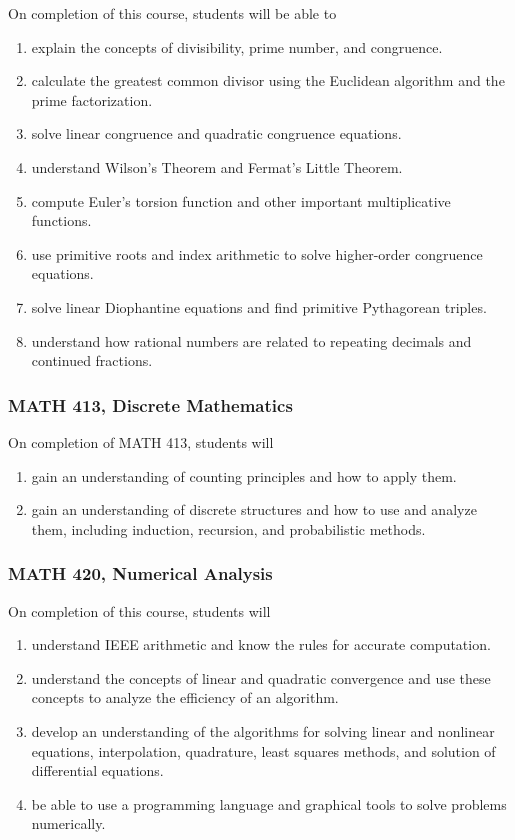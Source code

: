 \documentclass[11pt]{article}
\newenvironment{alphalist}{
\begin{enumerate}[label=(\arabic*),widest=107 ,leftmargin=25pt, itemsep=0pt]}
{\end{enumerate}}
\begin{document}
On completion of this course, students will be able to
\begin{alphalist}
    \item explain the concepts of divisibility, prime number, and congruence. 
    \item calculate the greatest common divisor using the Euclidean algorithm and the prime factorization.
    \item solve linear congruence and quadratic congruence equations.
    \item understand Wilson's Theorem and Fermat's Little Theorem. 
    \item compute Euler's torsion function and other important multiplicative functions.
    \item use primitive roots and index arithmetic to solve higher-order congruence equations.  
    \item solve linear Diophantine equations and find primitive Pythagorean triples.
    \item understand how rational numbers are related to repeating decimals and continued fractions.
\end{alphalist}

\subsubsection{MATH 413, Discrete Mathematics}

On completion of MATH 413, students will 
\begin{alphalist}
    \item gain an understanding of counting principles and how to apply them.
    \item gain an understanding of discrete structures and how to use and analyze them, including induction, recursion, and probabilistic methods.
\end{alphalist}

\subsubsection{MATH 420, Numerical Analysis}

On completion of this course, students will
\begin{alphalist}
    \item understand IEEE arithmetic and know the rules for accurate computation.
    \item understand the concepts of linear and quadratic convergence and use these concepts to analyze 
        the efficiency of an algorithm.
    \item develop an understanding of the algorithms for solving linear and nonlinear equations, interpolation, 
       quadrature, least squares methods, and solution of differential equations.
    \item be able to use a programming language and graphical tools to solve problems numerically.
\end{alphalist}
\end{document}

